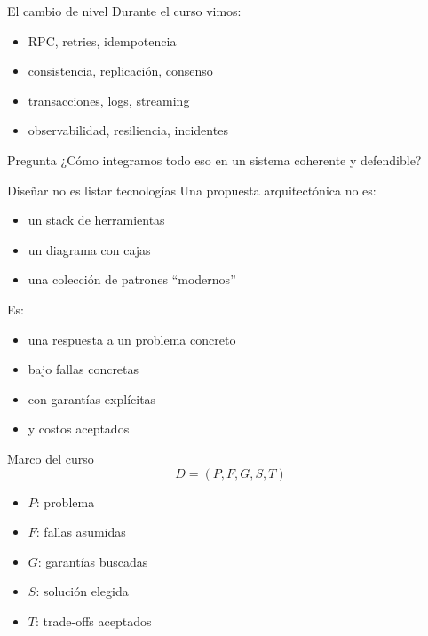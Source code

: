 \documentclass[institutional,screen,none]{ua-engineering-v6-beamer}
\title{\UACourse}
\subtitle{Clase 15 --- Defensa arquitectónica, trade-offs y revisión de casos}
\author{\UAProfessor}
\date{\UADate}
\begin{document}
{
\begin{frame}[plain]
\titlepage
\end{frame}
}


\begin{frame}{El cambio de nivel}
Durante el curso vimos:
\begin{itemize}
\item RPC, retries, idempotencia
\item consistencia, replicación, consenso
\item transacciones, logs, streaming
\item observabilidad, resiliencia, incidentes
\end{itemize}

\pause

\begin{block}{Pregunta}
¿Cómo integramos todo eso en un sistema coherente y defendible?
\end{block}
\end{frame}

\begin{frame}{Diseñar no es listar tecnologías}
Una propuesta arquitectónica no es:
\begin{itemize}
\item un stack de herramientas
\item un diagrama con cajas
\item una colección de patrones “modernos”
\end{itemize}

\pause

Es:
\begin{itemize}
\item una respuesta a un problema concreto
\item bajo fallas concretas
\item con garantías explícitas
\item y costos aceptados
\end{itemize}
\end{frame}


\begin{frame}{Marco del curso}
\[
D = (P, F, G, S, T)
\]

\pause

\begin{itemize}
\item $P$: problema
\item $F$: fallas asumidas
\item $G$: garantías buscadas
\item $S$: solución elegida
\item $T$: trade-offs aceptados
\end{itemize}
\end{frame}
\end{document}
